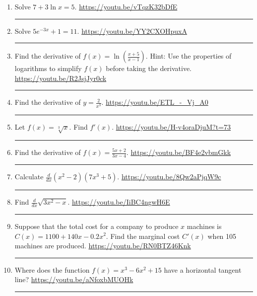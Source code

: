 \documentclass[12pt]{article}
\newcommand{\ds}{\displaystyle}
\begin{document}
\begin{enumerate}
\item Solve $7+3 \ln x = 5$. 
\vfill
\hfill \url{https://youtu.be/vTqzK32bDfE}
\hrule 


\newpage
\item Solve $5e^{-3x} + 1 = 11$.
\vfill
\hfill \url{https://youtu.be/YY2CXOHpuxA}
\hrule



\item Find the derivative of $\ds f(x) = \ln\left( \frac{x+5}{x-1} \right)$. Hint: Use the properties of logarithms to simplify $f(x)$ before taking the derivative.
\vfill
\hfill \url{https://youtu.be/R2JsjJyr0ck}
\hrule



\item Find the derivative of $\ds y = \frac{2}{x^3}$. 
\vfill
\hfill \url{https://youtu.be/ETL_-_Vj_A0}
\hrule


\item Let $f(x) = \sqrt[3]{x}$. Find $f'(x)$.
\vfill
\hfill \url{https://youtu.be/H-v4oraDjuM?t=73}
\hrule

\newpage
\item Find the derivative of $\ds f(x) = \frac{5x+2}{3x-4}$.
\vfill
\hfill \url{https://youtu.be/BF4e2vbmGkk}
\hrule


\item Calculate $\ds \frac{d}{dx} (x^2 - 2)(7x^3+5)$.
\vfill
\hfill \url{https://youtu.be/8Qw2aPjqW9c}
\hrule

\item Find $\ds \frac{d}{dx} \sqrt{ 3x^2 - x}$.
\vfill
\hfill \url{https://youtu.be/IiBC4ngwH6E}
\hrule


\item Suppose that the total cost for a company to produce $x$ machines is $C(x) = 1100 + 140x - 0.2x^2$. Find the marginal cost $C'(x)$ when 105 machines are produced. 
\vfill
\hfill \url{https://youtu.be/RN0BTZ46Knk}
\hrule 


\item Where does the function $f(x) = x^3 - 6x^2 + 15$ have a horizontal tangent line? 
\vfill
\hfill \url{https://youtu.be/aNfoxbMUOHk}
\hrule


\end{enumerate}
\end{document}
